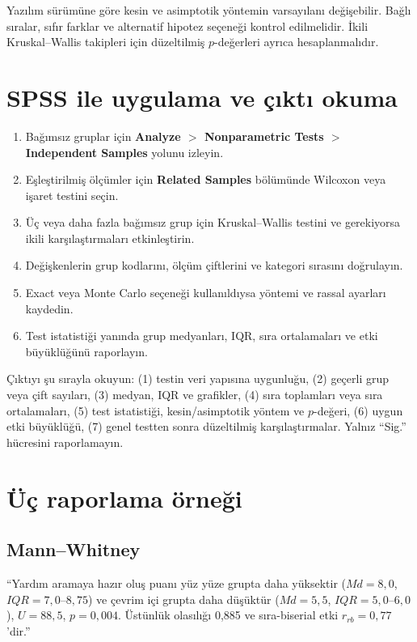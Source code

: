 Yazılım sürümüne göre kesin ve asimptotik yöntemin varsayılanı değişebilir.
Bağlı sıralar, sıfır farklar ve alternatif hipotez seçeneği kontrol edilmelidir.
İkili Kruskal--Wallis takipleri için düzeltilmiş $p$-değerleri ayrıca
hesaplanmalıdır.

\section{SPSS ile uygulama ve çıktı okuma}

\begin{enumerate}
  \item Bağımsız gruplar için \textbf{Analyze $>$ Nonparametric Tests $>$ Independent Samples} yolunu izleyin.
  \item Eşleştirilmiş ölçümler için \textbf{Related Samples} bölümünde Wilcoxon veya işaret testini seçin.
  \item Üç veya daha fazla bağımsız grup için Kruskal--Wallis testini ve gerekiyorsa ikili karşılaştırmaları etkinleştirin.
  \item Değişkenlerin grup kodlarını, ölçüm çiftlerini ve kategori sırasını doğrulayın.
  \item Exact veya Monte Carlo seçeneği kullanıldıysa yöntemi ve rassal ayarları kaydedin.
  \item Test istatistiği yanında grup medyanları, IQR, sıra ortalamaları ve etki büyüklüğünü raporlayın.
\end{enumerate}

\begin{outputguidebox}
Çıktıyı şu sırayla okuyun: (1) testin veri yapısına uygunluğu, (2) geçerli grup
veya çift sayıları, (3) medyan, IQR ve grafikler, (4) sıra toplamları veya sıra
ortalamaları, (5) test istatistiği, kesin/asimptotik yöntem ve $p$-değeri,
(6) uygun etki büyüklüğü, (7) genel testten sonra düzeltilmiş karşılaştırmalar.
Yalnız ``Sig.'' hücresini raporlamayın.
\end{outputguidebox}

\section{Üç raporlama örneği}

\subsection*{Mann--Whitney}

``Yardım aramaya hazır oluş puanı yüz yüze grupta daha yüksektir
($Md=8{,}0$, $IQR=7{,}0$--$8{,}75$) ve çevrim içi grupta daha düşüktür
($Md=5{,}5$, $IQR=5{,}0$--$6{,}0$), $U=88{,}5$, $p=0{,}004$.
Üstünlük olasılığı 0,885 ve sıra-biserial etki $r_{rb}=0{,}77$'dir.''

